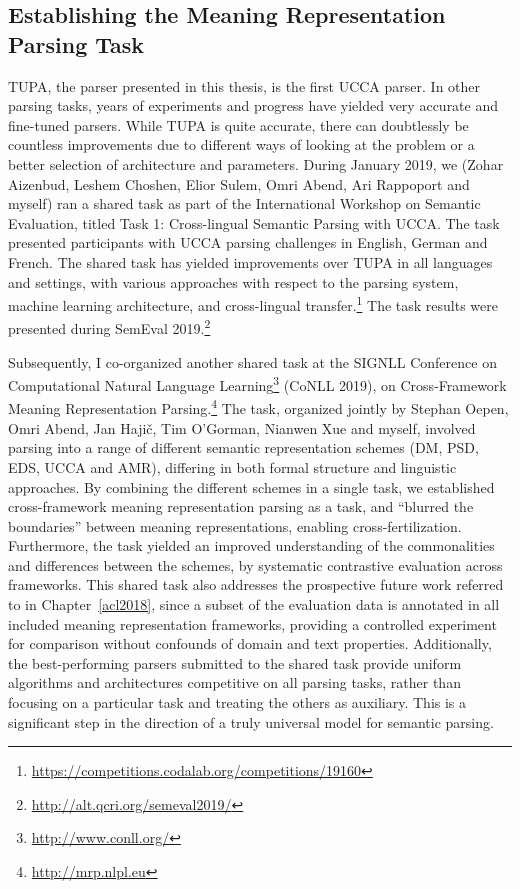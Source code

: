 \documentclass[12pt,a4paper,table]{report}
\begin{document}
\subsection{Establishing the Meaning Representation Parsing Task}

TUPA, the parser presented in this thesis, is the first UCCA parser.
In other parsing tasks, years of experiments and progress have yielded very
accurate and fine-tuned parsers.
While TUPA is quite accurate, there can doubtlessly be countless improvements
due to different ways of looking at the problem or a better selection of architecture
and parameters.
During January 2019, we (Zohar Aizenbud, Leshem Choshen, Elior Sulem, Omri Abend,
Ari Rappoport and myself) ran a shared task as part of the
International Workshop on Semantic Evaluation, titled
Task 1: Cross-lingual Semantic Parsing with UCCA.
The task presented participants with UCCA parsing challenges
in English, German and French.
The shared task has yielded improvements over TUPA
in all languages and settings,
with various approaches with respect to the parsing system,
machine learning architecture, and cross-lingual
transfer.\footnote{\url{https://competitions.codalab.org/competitions/19160}}
The task results were presented during SemEval
2019.\footnote{\url{http://alt.qcri.org/semeval2019/}}

Subsequently, I co-organized another shared task at
the SIGNLL Conference on Computational Natural Language
Learning\footnote{\url{http://www.conll.org/}} (CoNLL 2019),
on Cross-Framework Meaning Representation Parsing.\footnote{\url{http://mrp.nlpl.eu}}
The task, organized jointly by Stephan Oepen, Omri Abend, Jan Haji\v{c},
Tim O'Gorman, Nianwen Xue and myself,
involved parsing into a range of different semantic representation schemes
(DM, PSD, EDS, UCCA and AMR), differing in both formal structure and linguistic
approaches.
By combining the different schemes in a single task, we
established cross-framework meaning representation parsing as a task,
and ``blurred the boundaries'' between meaning representations,
enabling cross-fertilization.
Furthermore, the task yielded an improved understanding of the commonalities
and differences between the schemes, by systematic contrastive evaluation
across frameworks.
This shared task also addresses the prospective future work referred to in Chapter~\ref{acl2018},
since a subset of the evaluation data is annotated in all included
meaning representation frameworks, providing a controlled experiment
for comparison without confounds of domain and text properties.
Additionally, the best-performing parsers submitted to the shared task provide
uniform algorithms and architectures competitive on all parsing tasks,
rather than focusing on a particular task and treating the others as auxiliary.
This is a significant step in the direction of a truly universal model for semantic
parsing.
\end{document}
